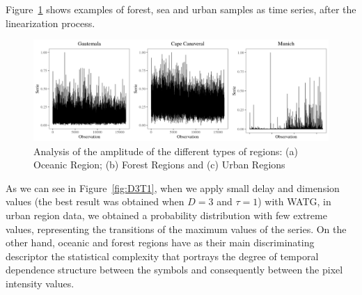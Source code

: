 \documentclass{isprs}
\begin{document}


Figure~\ref{fig:AmplitudeSAR} shows examples of forest, sea and urban samples as time series, after the linearization process.

\begin{figure}[hbt]
	\includegraphics[width=\columnwidth]{Figures/SAR_signal.pdf}
	\caption{Analysis of the amplitude of the different types of regions: (a) Oceanic Region; (b) Forest Regions and (c) Urban Regions}
	\label{fig:AmplitudeSAR}
\end{figure}


As we can see in Figure~\ref{fig:D3T1}, when we apply small delay and dimension values (the best result was obtained when $D = 3$ and $\tau = 1$) with WATG, in urban region data, we obtained a probability distribution with few extreme values, representing the transitions of the maximum values of the series.
On the other hand, oceanic and forest regions have as their main discriminating descriptor the statistical complexity that portrays the degree of temporal dependence structure between the symbols and consequently between the pixel intensity values.
\end{document}

